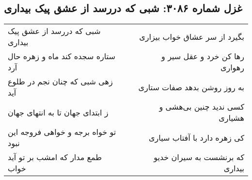 \begin{center}
\section*{غزل شماره ۳۰۸۶: شبی که دررسد از عشق پیک بیداری}
\label{sec:3086}
\begin{longtable}{l p{0.5cm} r}
شبی که دررسد از عشق پیک بیداری
&&
بگیرد از سر عشاق خواب بیزاری
\\
ستاره سجده کند ماه و زهره حال آرد
&&
رها کن خرد و عقل سیر و رهواری
\\
زهی شبی که چنان نجم در طلوع آید
&&
به روز روشن بدهد صفات ستاری
\\
ز ابتدای جهان تا به انتهای جهان
&&
کسی ندید چنین بی‌هشی و هشیاری
\\
تو خواه برجه و خواهی فروجه این نبود
&&
کی زهره دارد با آفتاب سیاری
\\
طمع مدار که امشب بر تو آید خواب
&&
که برنشست به سیران خدیو بیداری
\\
\end{longtable}
\end{center}
